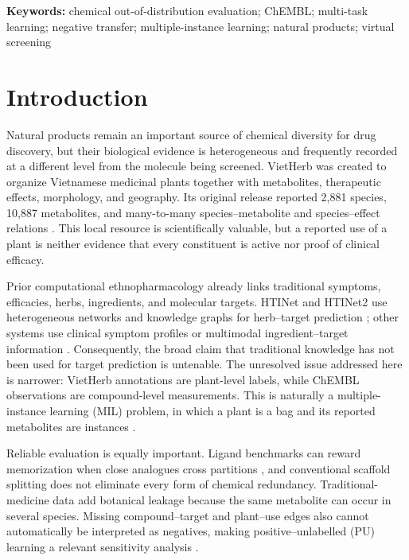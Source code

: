 \documentclass[11pt]{article}
\begin{document}
\noindent\textbf{Keywords:} chemical out-of-distribution evaluation; ChEMBL;
multi-task learning; negative transfer; multiple-instance learning; natural
products; virtual screening

\section{Introduction}

Natural products remain an important source of chemical diversity for drug
discovery, but their biological evidence is heterogeneous and frequently
recorded at a different level from the molecule being screened. VietHerb was
created to organize Vietnamese medicinal plants together with metabolites,
therapeutic effects, morphology, and geography. Its original release reported
2,881 species, 10,887 metabolites, and many-to-many species--metabolite and
species--effect relations \citep{nguyenvo2019vietherb}. This local resource is
scientifically valuable, but a reported use of a plant is neither evidence that
every constituent is active nor proof of clinical efficacy.

Prior computational ethnopharmacology already links traditional symptoms,
efficacies, herbs, ingredients, and molecular targets. HTINet and HTINet2 use
heterogeneous networks and knowledge graphs for herb--target prediction
\citep{wang2019htinet,duan2024htinet2}; other systems use clinical symptom
profiles or multimodal ingredient--target information
\citep{cheung2026novelhti,liang2025multiiti}. Consequently, the broad claim that
traditional knowledge has not been used for target prediction is untenable.
The unresolved issue addressed here is narrower: VietHerb annotations are
plant-level labels, while ChEMBL observations are compound-level measurements.
This is naturally a multiple-instance learning (MIL) problem, in which a plant
is a bag and its reported metabolites are instances
\citep{ilse2018attention,doran2012mil}.

Reliable evaluation is equally important. Ligand benchmarks can reward
memorization when close analogues cross partitions \citep{wallach2018memorization},
and conventional scaffold splitting does not eliminate every form of chemical
redundancy. Traditional-medicine data add botanical leakage because the same
metabolite can occur in several species. Missing compound--target and
plant--use edges also cannot automatically be interpreted as negatives, making
positive--unlabelled (PU) learning a relevant sensitivity analysis
\citep{kiryo2017nnpu,wang2026prodti}.
\end{document}
